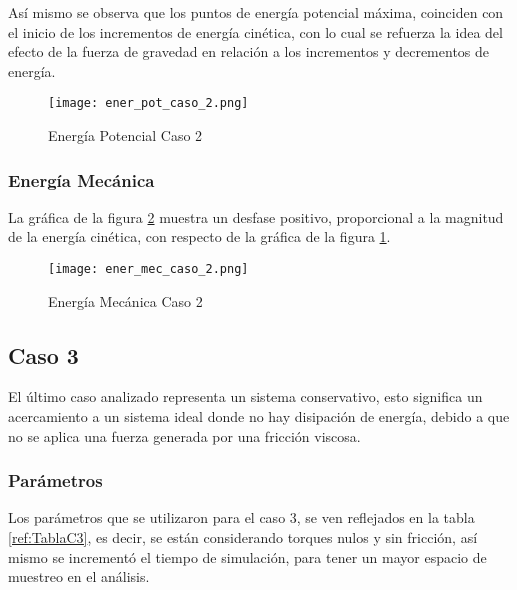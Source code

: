     Así mismo se observa que los puntos de energía potencial máxima, coinciden con 
    el inicio de los incrementos de energía cinética, con lo cual se refuerza la 
    idea del efecto de la fuerza de gravedad en relación a los incrementos y 
    decrementos de energía. 

    \begin{figure} [H]%
            \centering
            \texttt{[image: ener\_pot\_caso\_2.png]} 
        \caption{Energía Potencial Caso 2}
        \label{fig:ePotC2}
    \end{figure}

    \subsubsection{Energía Mecánica}
    La gráfica de la figura \ref{fig:eMecC2} muestra un desfase positivo, 
    proporcional a la magnitud de la energía cinética, con respecto de la 
    gráfica de la figura \ref{fig:ePotC2}.
    \begin{figure} [H]%
            \centering
            \texttt{[image: ener\_mec\_caso\_2.png]} 
        \caption{Energía Mecánica Caso 2}
        \label{fig:eMecC2}
    \end{figure}

    

\subsection{Caso 3}\label{caso3}
    El último caso analizado representa un sistema conservativo, esto significa 
    un acercamiento a un sistema ideal donde no hay disipación de energía, 
    debido a que no se aplica una fuerza generada por una fricción viscosa.

    \subsubsection{Parámetros}

    Los parámetros que se utilizaron para el caso 3, se ven reflejados en la 
    tabla \ref{ref:TablaC3}, es decir, se están considerando torques nulos y 
    sin fricción, así mismo se incrementó el tiempo de simulación, para tener un 
    mayor espacio de muestreo en el análisis.

